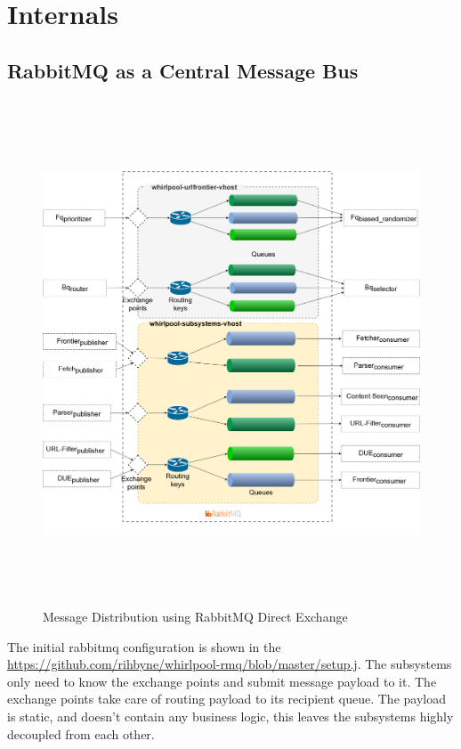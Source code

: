 \section{Internals}\label{internals}
\subsection{RabbitMQ as a Central Message Bus}
\begin{figure}[h!]
  \centering
  \includegraphics[width=20cm,height=15cm,keepaspectratio]{../media/crawler/rmq-broker.png}
  \caption{Message Distribution using RabbitMQ Direct Exchange}
  \label{fig:rmq}
\end{figure}

\noindent
The initial rabbitmq configuration is shown in the \url{https://github.com/rihbyne/whirlpool-rmq/blob/master/setup.j}. The subsystems only need to know the exchange points and submit message payload to it. The exchange points take care of routing payload to its recipient queue. The payload is static, and doesn't contain any business logic, this leaves the subsystems highly decoupled from each other.
\pagebreak

